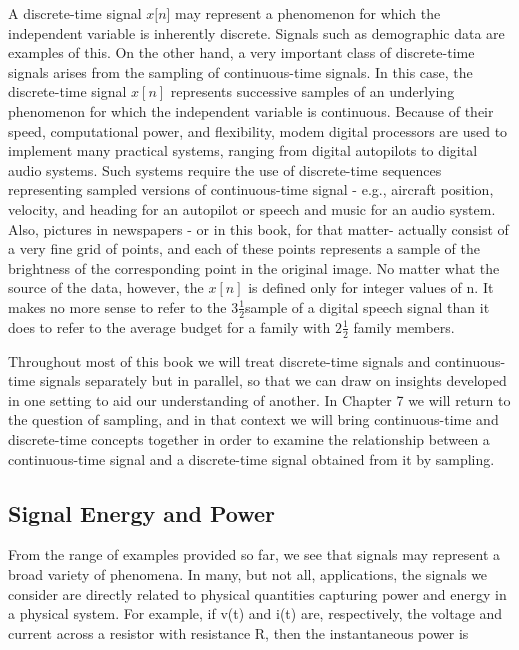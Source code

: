 \documentclass{report}
\begin{document}
A discrete-time signal \(x[n\)] may represent a phenomenon for which the independent variable is inherently discrete. Signals such as demographic
data are examples of this. On the other hand, a very important class of discrete-time signals arises from the sampling of continuous-time signals.
In this case, the discrete-time signal \(x[n]\) represents successive samples of an underlying phenomenon for which the independent variable is continuous.
Because of their speed, computational power, and flexibility, modem digital processors are used to implement many practical systems, ranging from
digital autopilots to digital audio systems. Such systems require the use of discrete-time sequences representing sampled versions of continuous-time
signal - e.g., aircraft position, velocity, and heading for an autopilot or speech and music for an audio system. Also, pictures in newspapers -
or in this book, for that matter- actually consist of a very fine grid of points, and each of these points represents a sample of the brightness
of the corresponding point in the original image. No matter what the source of the data, however, the \(x[n]\) is defined only for integer values
of n. It makes no more sense to refer to the \(3\frac{1 }{2 }\)sample of a digital speech signal than it does to refer to the average budget for
a family with \(2\frac{1 }{2}\) family members.

Throughout most of this book we will treat discrete-time signals and continuous-time signals separately but in parallel, so that we can draw on insights
developed in one setting to aid our understanding of another. In Chapter 7 we will return to the question of sampling, and in that context we will
bring continuous-time and discrete-time concepts together in order to examine the relationship between a continuous-time signal and a discrete-time
signal obtained from it by sampling.

\subsection*{Signal Energy and Power}

From the range of examples provided so far, we see that signals may represent a broad variety of phenomena. In many, but not all, applications, the
signals we consider are directly related to physical quantities capturing power and energy in a physical system. For example, if v(t) and i(t) are,
respectively, the voltage and current across a resistor with resistance R, then the instantaneous power is
\end{document}
